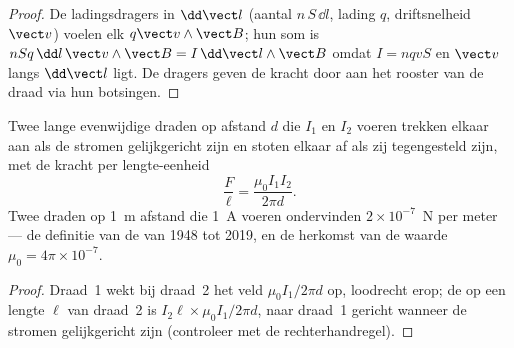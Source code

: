 \begin{proof}
De ladingsdragers in $\dd\vect l$ (aantal $n\,S\,\dd l$, lading $q$,
driftsnelheid $\vect v$) voelen elk $q\vect v\wedge\vect B$; hun som is
$nSq\,\dd l\,\vect v\wedge\vect B = I\,\dd\vect l\wedge\vect B$ omdat $I = nqvS$
en $\vect v$ langs $\dd\vect l$ ligt. De dragers geven de kracht door aan het
rooster van de draad via hun botsingen.
\end{proof}

\begin{proposition}\label{prop:b1:magnetostatics:parallel}
Twee lange evenwijdige draden op afstand $d$ die $I_1$ en $I_2$ voeren
trekken elkaar aan als de stromen gelijkgericht zijn en stoten elkaar af als zij tegengesteld zijn,
met de kracht per lengte-eenheid
\[
\frac{F}{\ell} = \frac{\mu_0I_1I_2}{2\pi d} .
\]
Twee draden op \qty{1}{m} afstand die \qty{1}{A} voeren ondervinden $2 \times 10^{-7}$~N per
meter --- de definitie van de  van 1948 tot 2019, en de
herkomst van de waarde $\mu_0 = 4\pi \times 10^{-7}$.
\end{proposition}

\begin{proof}
Draad~1 wekt bij draad~2 het veld $\mu_0I_1/2\pi d$ op, loodrecht erop; de
 op een lengte $\ell$ van draad~2 is $I_2\ell \times \mu_0I_1/2\pi d$,
naar draad~1 gericht wanneer de stromen gelijkgericht zijn (controleer met
de rechterhandregel).
\end{proof}

